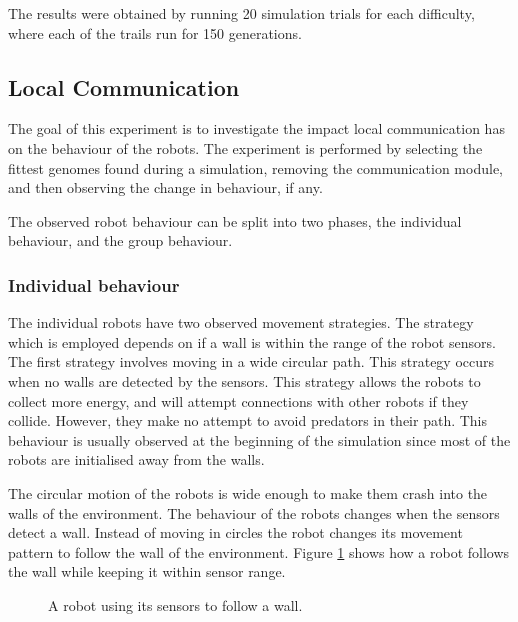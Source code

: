 The results were obtained by running 20 simulation trials for each difficulty, where each of the trails run for 150 generations.

\newpage
\pagestyle{plain}



\newpage
\pagestyle{main}

\subsection{Local Communication}
\label{sec:local_communication}
The goal of this experiment is to investigate the impact local communication has on the behaviour of the robots.
The experiment is performed by selecting the fittest genomes found during a simulation, removing the communication module, and then observing the change in behaviour, if any.

The observed robot behaviour can be split into two phases, the individual behaviour, and the group behaviour.

\subsubsection{Individual behaviour}
\label{sec:invdividual_behaviour}
The individual robots have two observed movement strategies.
The strategy which is employed depends on if a wall is within the range of the robot sensors.
The first strategy involves moving in a wide circular path.
This strategy occurs when no walls are detected by the sensors.
This strategy allows the robots to collect more energy, and will attempt connections with other robots if they collide.
However, they make no attempt to avoid predators in their path.
This behaviour is usually observed at the beginning of the simulation since most of the robots are initialised away from the walls.

The circular motion of the robots is wide enough to make them crash into the walls of the environment.
The behaviour of the robots changes when the sensors detect a wall.
Instead of moving in circles the robot changes its movement pattern to follow the wall of the environment.
Figure \ref{fig:individual-wall-drive} shows how a robot follows the wall while keeping it within sensor range.

\begin{figure}[H]    
	\centering
	\caption{A robot using its sensors to follow a wall.}
	\label{fig:individual-wall-drive}
\end{figure}


